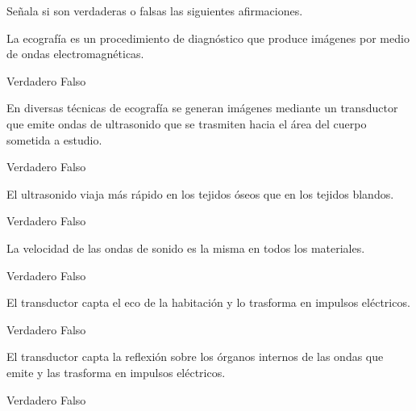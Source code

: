 Señala si son verdaderas o falsas las siguientes afirmaciones.
\begin{parts}
    La ecografía es un procedimiento de diagnóstico que produce imágenes por medio de ondas electromagnéticas.
    {\footnotesize
    \begin{choices}
        \choice Verdadero
        \choice Falso
    \end{choices}
    }

    En diversas técnicas de ecografía se generan imágenes mediante un transductor que emite ondas de ultrasonido que se trasmiten hacia el área del cuerpo sometida a estudio.
        {\footnotesize
            \begin{choices}
                \choice Verdadero
                \choice Falso
            \end{choices}
        }

    El ultrasonido viaja más rápido en los tejidos óseos que en los tejidos blandos.
        {\footnotesize
            \begin{choices}
                \choice Verdadero
                \choice Falso
            \end{choices}
        }

    La velocidad de las ondas de sonido es la misma en todos los materiales.
        {\footnotesize
            \begin{choices}
                \choice Verdadero
                \choice Falso
            \end{choices}
        }

    El transductor capta el eco de la habitación y lo trasforma en impulsos eléctricos.
    {\footnotesize
    \begin{choices}
        \choice Verdadero
        \choice Falso
    \end{choices}
    }

    El transductor capta la reflexión sobre los órganos internos de las ondas que emite y las trasforma en impulsos eléctricos.
    {\footnotesize
    \begin{choices}
        \choice Verdadero
        \choice Falso
    \end{choices}
    }
\end{parts}